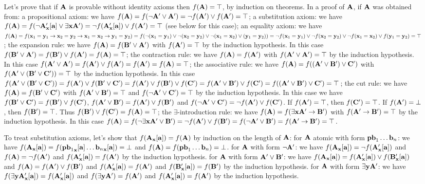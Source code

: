 Let's prove that if ${\bf A}$ is provable without identity axioms then $f({\bf A}) = \top$, by induction on theorems.
In a proof of ${\bf A}$, if ${\bf A}$ was obtained from:
\itemitem{$\bullet$} a propositional axiom: we have $f({\bf A}) = f(\neg {\bf A}' \lor {\bf A}') = \neg f({\bf A}') \lor f({\bf A}') = \top$;
\itemitem{$\bullet$} a substitution axiom: we have 
$f({\bf A}) = f(\neg {\bf A}'_{\bf x}[{\bf a}] \lor \exists {\bf x}{\bf A}') = \neg f({\bf A}'_{\bf x}[{\bf a}]) \lor f({\bf A}') = \top$ (see below for this case);
\itemitem{$\bullet$} an equality axiom: we have $f({\bf A}) = 
f({\bf x}_1 = {\bf y}_1 \to {\bf x}_2 = {\bf y}_2 \to {\bf x}_1 = {\bf x}_2 \to {\bf y}_1 = {\bf y}_2) =
f(\neg ({\bf x}_1 = {\bf y}_1) \lor \neg ({\bf x}_2 = {\bf y}_2) \lor \neg ({\bf x}_1 = {\bf x}_2) \lor ({\bf y}_1 = {\bf y}_2)) =
\neg f({\bf x}_1 = {\bf y}_1) \lor \neg f({\bf x}_2 = {\bf y}_2) \lor \neg f({\bf x}_1 = {\bf x}_2) \lor f({\bf y}_1 = {\bf y}_2) = \top$;
\itemitem{$\bullet$} the expansion rule: we have $f({\bf A}) = f({\bf B}' \lor {\bf A}')$ with $f({\bf A}') = \top$ by the induction hypothesis.
In this case $f({\bf B}' \lor {\bf A}') = f({\bf B}') \lor f({\bf A}') = f({\bf A}) = \top$;
\itemitem{$\bullet$} the contraction rule: we have $f({\bf A}) = f({\bf A}')$ with $f({\bf A}' \lor {\bf A}') = \top$ by the induction hypothesis. 
In this case $f({\bf A}' \lor {\bf A}') = f({\bf A}') \lor f({\bf A}') = f({\bf A}') = f({\bf A}) = \top$;
\itemitem{$\bullet$} the associative rule: we have $f({\bf A}) = f(({\bf A}' \lor {\bf B}') \lor {\bf C}')$ with $f({\bf A}' \lor ({\bf B}' \lor {\bf C}')) = \top$ by the induction hypothesis.
In this case $f({\bf A}' \lor ({\bf B}' \lor {\bf C}')) = f({\bf A}') \lor f({\bf B}' \lor {\bf C}') = f({\bf A}') \lor f({\bf B}') \lor f({\bf C}') =
f({\bf A}' \lor {\bf B}') \lor f({\bf C}') = f(({\bf A}' \lor {\bf B}') \lor {\bf C}') = \top$;
\itemitem{$\bullet$} the cut rule: we have $f({\bf A}) = f({\bf B}' \lor {\bf C}')$ with $f({\bf A}' \lor {\bf B}') = \top$ and $f(\neg {\bf A}' \lor {\bf C}') = \top$ by the induction hypothesis.
In this case we have $f({\bf B}' \lor {\bf C}') = f({\bf B}') \lor f({\bf C}')$, $f({\bf A}' \lor {\bf B}') = f({\bf A}') \lor f({\bf B}')$ and
$f(\neg {\bf A}' \lor {\bf C}') = \neg f({\bf A}') \lor f({\bf C}')$. If $f({\bf A}') = \top$, then $f({\bf C}') = \top$. 
If $f({\bf A}') = \bot$, then $f({\bf B}') = \top$. Thus $f({\bf B}') \lor f({\bf C}') = f({\bf A}) = \top$;
\itemitem{$\bullet$} the $\exists$-introduction rule: we have $f({\bf A}) = f(\exists {\bf x}{\bf A}' \to {\bf B}')$ with $f({\bf A}' \to {\bf B}') = \top$ by the induction hypothesis.
In this case $f({\bf A}) = f(\neg \exists {\bf x}{\bf A}' \lor {\bf B}') = \neg f({\bf A}') \lor f({\bf B}') = f(\neg {\bf A}' \lor {\bf B}') = f({\bf A}' \to {\bf B}') = \top$.

To treat substitution axioms, let's show that $f({\bf A}_{\bf x}[{\bf a}]) = f({\bf A})$ by induction on the length of ${\bf A}$:
\itemitem{$\bullet$} for ${\bf A}$ atomic with form ${\bf pb}_1 \dots {\bf b}_n$: we have $f({\bf A}_{\bf x}[{\bf a}]) = f({{\bf pb}_1}_{\bf x}[{\bf a}] \dots {{\bf b}_n}_{\bf x}[{\bf a}]) = \bot$
and $f({\bf A}) = f({\bf pb}_1 \dots {\bf b}_n) = \bot$.
\itemitem{$\bullet$} for ${\bf A}$ with form $\neg {\bf A}'$: we have $f({\bf A}_{\bf x}[{\bf a}]) = \neg f({\bf A}'_{\bf x}[{\bf a}])$
and $f({\bf A}) = \neg f({\bf A}')$ and $f({\bf A}'_{\bf x}[{\bf a}]) = f({\bf A}')$ by the induction hypothesis.
\itemitem{$\bullet$} for ${\bf A}$ with form ${\bf A}' \lor {\bf B}'$: we have $f({\bf A}_{\bf x}[{\bf a}]) = f({\bf A}'_{\bf x}[{\bf a}]) \lor f({\bf B}'_{\bf x}[{\bf a}])$
and $f({\bf A}) = f({\bf A}') \lor f({\bf B}')$ and $f({\bf A}'_{\bf x}[{\bf a}]) = f({\bf A}')$ and
$f({\bf B}'_{\bf x}[{\bf a}]) = f({\bf B}')$ by the induction hypothesis.
\itemitem{$\bullet$} for ${\bf A}$ with form $\exists {\bf y}{\bf A}'$: we have $f(\exists {\bf y}{\bf A}'_{\bf x}[{\bf a}]) = f({\bf A}'_{\bf x}[{\bf a}])$
and $f(\exists {\bf y}{\bf A}') = f({\bf A}')$ and $f({\bf A}'_{\bf x}[{\bf a}]) = f({\bf A}')$ by the induction hypothesis.

